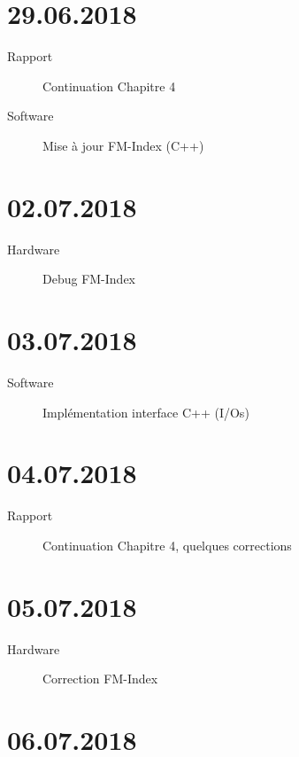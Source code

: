 \section*{29.06.2018}

\begin{description}
	\item [Rapport] Continuation Chapitre 4
	\item [Software] Mise à jour FM-Index (C++)
\end{description}

\section*{02.07.2018}

\begin{description}
	\item [Hardware] Debug FM-Index
\end{description}

\section*{03.07.2018}

\begin{description}
    \item [Software] Implémentation interface C++ (I/Os)
	\end{description}

\section*{04.07.2018}

\begin{description}
	\item [Rapport] Continuation Chapitre 4, quelques corrections
\end{description}

\section*{05.07.2018}

\begin{description}
	\item [Hardware] Correction FM-Index
\end{description}

\section*{06.07.2018}


